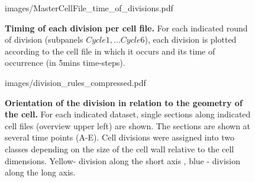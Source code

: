 \documentclass[11pt,a4paper, final]{article}
\begin{document}
%
\begin{figure}[htbp]
	\begin{center}
	\begin{overpic}[width=.66\linewidth]{images/MasterCellFile_time_of_divisions.pdf}
	\end{overpic}
\caption[Timing of each division per cell file.]
{{\bf Timing of each division per cell file.} For each indicated round of division (subpanels $Cycle 1, ... Cycle 6$), each division is plotted according to the cell file in which it occurs and its time of occurrence (in 5mins  time-steps). }
	\label{fig:mastertimediv}
	\end{center}
\end{figure}
%
\clearpage


%
\begin{figure}[htbp]
	\begin{overpic}[width=1.\linewidth]{images/division_rules_compressed.pdf}
	\end{overpic}
\caption[Orientation of the division in relation to the geometry of the cell.]
{{\bf Orientation of the division in relation to the geometry of the cell.} For each indicated dataset, single sections along indicated cell files (overview upper left) are shown. The sections are shown at several time points (A-E). Cell divisions were assigned into two classes depending on the size of the cell wall relative to the cell dimensions. Yellow- division along the short axis , blue - division along the long axis. }
	\label{fig:divrules}
\end{figure}
%
\clearpage
\end{document}
